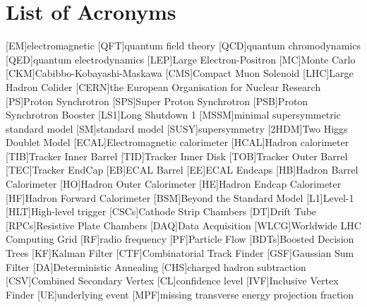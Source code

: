 




\chapter*{List of Acronyms}
\begin{acronym}[CERN]
[EM]{electromagnetic}
[QFT]{quantum field theory}
[QCD]{quantum chromodynamics}
[QED]{quantum electrodynamics}
[LEP]{Large Electron-Positron}
[MC]{Monte Carlo}
[CKM]{Cabibbo-Kobayashi-Maskawa}
[CMS]{Compact Muon Solenoid}
[LHC]{Large Hadron Colider}
[CERN]{the European Organisation for Nuclear Research }
[PS]{Proton Synchrotron}
[SPS]{Super Proton Synchrotron}
[PSB]{Proton Synchrotron Booster}
[LS1]{Long Shutdown 1}
[MSSM]{minimal supersymmetric standard model}
[SM]{standard model}
[SUSY]{supersymmetry}
[2HDM]{Two Higgs Doublet Model}
[ECAL]{Electromagnetic calorimeter}
[HCAL]{Hadron calorimeter}
[TIB]{Tracker Inner Barrel}
[TID]{Tracker Inner Disk}
[TOB]{Tracker Outer Barrel}
[TEC]{Tracker EndCap}
[EB]{ECAL Barrel}
[EE]{ECAL Endcaps}
[HB]{Hadron Barrel Calorimeter}
[HO]{Hadron Outer Calorimeter}
[HE]{Hadron Endcap Calorimeter}
[HF]{Hadron Forward Calorimeter}
[BSM]{Beyond the Standard Model}
[L1]{Level-1}
[HLT]{High-level trigger}
[CSCs]{Cathode Strip Chambers}
[DT]{Drift Tube}
[RPCs]{Resistive Plate Chambers}
[DAQ]{Data Acquisition}
[WLCG]{Worldwide LHC Computing Grid}
[RF]{radio frequency}
[PF]{Particle Flow}
[BDTs]{Boosted Decision Trees}
[KF]{Kalman Filter}
[CTF]{Combinatorial Track Finder}
[GSF]{Gaussian Sum Filter}
[DA]{Deterministic Annealing}
[CHS]{charged hadron subtraction}
[CSV]{Combined Secondary Vertex}
[CL]{confidence level}
[IVF]{Inclusive Vertex Finder}
[UE]{underlying event}
[MPF]{missing transverse energy projection fraction}
\end{acronym}

